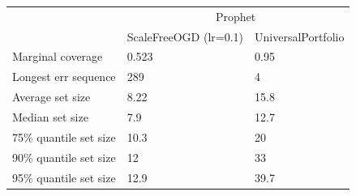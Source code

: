 \begin{tabular}{lll}
\toprule
& \multicolumn{2}{c}{Prophet} \\
& ScaleFreeOGD (lr=0.1) & UniversalPortfolio \\
\midrule
Marginal coverage & 0.523 & 0.95 \\
Longest err sequence & 289 & 4 \\
Average set size & 8.22 & 15.8 \\
Median set size & 7.9 & 12.7 \\
75\% quantile set size & 10.3 & 20 \\
90\% quantile set size & 12 & 33 \\
95\% quantile set size & 12.9 & 39.7 \\
\bottomrule
\end{tabular}
